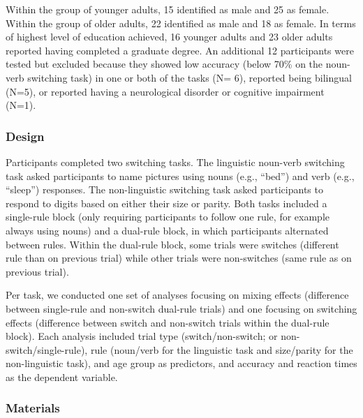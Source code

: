 \documentclass[
]{article}
\begin{document}
Within the group of younger adults, 15 identified as male and 25 as female. Within the group of older adults, 22 identified as male and 18 as female. In terms of highest level of education achieved, 16 younger adults and 23 older adults reported having completed a graduate degree.
An additional 12 participants were tested but excluded because they showed low accuracy (below 70\% on the noun-verb switching task) in one or both of the tasks (N= 6), reported being bilingual (N=5), or reported having a neurological disorder or cognitive impairment (N=1).

\hypertarget{design}{%
\subsubsection{Design}\label{design}}

Participants completed two switching tasks. The linguistic noun-verb switching task asked participants to name pictures using nouns (e.g., ``bed'') and verb (e.g., ``sleep'') responses. The non-linguistic switching task asked participants to respond to digits based on either their size or parity. Both tasks included a single-rule block (only requiring participants to follow one rule, for example always using nouns) and a dual-rule block, in which participants alternated between rules. Within the dual-rule block, some trials were switches (different rule than on previous trial) while other trials were non-switches (same rule as on previous trial).

Per task, we conducted one set of analyses focusing on mixing effects (difference between single-rule and non-switch dual-rule trials) and one focusing on switching effects (difference between switch and non-switch trials within the dual-rule block). Each analysis included trial type (switch/non-switch; or non-switch/single-rule), rule (noun/verb for the linguistic task and size/parity for the non-linguistic task), and age group as predictors, and accuracy and reaction times as the dependent variable.

\hypertarget{materials}{%
\subsubsection{Materials}\label{materials}}
\end{document}
